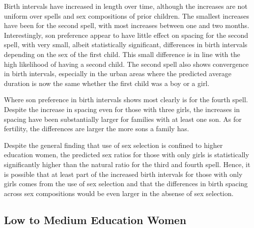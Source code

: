 \documentclass[12pt,letterpaper]{article}
\begin{document}
Birth intervals have increased in length over time, although the increases are not
uniform over spells and sex compositions of prior children.
The smallest increases have been for the second spell, with most increases between one
and two months.
Interestingly, son preference appear to have little effect on spacing for the second
spell, with very small, albeit statistically significant, differences in birth intervals 
depending on the sex of the first child.
This small difference is in line with the high likelihood of having a second child.
The second spell also shows convergence in birth intervals, especially in the urban
areas where the predicted average duration is now the same whether the first child was
a boy or a girl.

Where son preference in birth intervals shows most clearly is for the fourth spell.
Despite the increase in spacing even for those with three girls, the increases in 
spacing have been substantially larger for families with at least one son.
As for fertility, the differences are larger the more sons a family has.

Despite the general finding that use of sex selection is confined to higher education
women, the predicted sex ratios for those with only girls is statistically significantly
higher than the natural ratio for the third and fourth spell.
Hence, it is possible that at least part of the increased  birth intervals for those
with only girls comes from the use of sex selection and that the differences in
birth spacing across sex compositions would be even larger in the absense of sex selection.


\subsection{Low to Medium Education Women}


\end{document}
